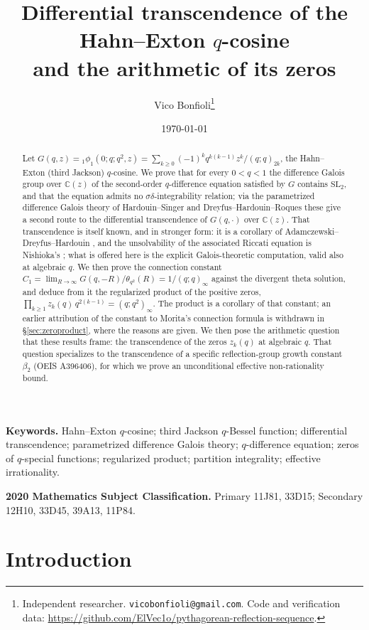 \documentclass[11pt]{article}
\title{Differential transcendence of the Hahn--Exton $q$-cosine\\ and the arithmetic of its zeros}
\author{Vico Bonfioli\thanks{Independent researcher. \texttt{vicobonfioli@gmail.com}. Code and
verification data: \url{https://github.com/ElVec1o/pythagorean-reflection-sequence}.}}
\date{\today}
\theoremstyle{plain}
\theoremstyle{definition}
\theoremstyle{remark}
\newcommand{\C}{\mathbb{C}}
\begin{document}
\maketitle

\begin{abstract}
Let $G(q,z)={}_1\phi_1(0;q;q^2,z)=\sum_{k\ge0}(-1)^kq^{k(k-1)}z^k/(q;q)_{2k}$, the Hahn--Exton (third
Jackson) $q$-cosine. We prove that for every $0<q<1$ the difference Galois group over $\C(z)$ of the
second-order $q$-difference equation satisfied by $G$ contains $\mathrm{SL}_2$, and that the equation
admits no $\sigma\delta$-integrability relation; via the parametrized difference Galois theory of
Hardouin--Singer \cite{HS} and Dreyfus--Hardouin--Roques \cite{DHR2018} these give a second route to the differential
transcendence of $G(q,\cdot)$ over $\C(z)$. That transcendence is itself known, and in stronger form:
it is a corollary of Adamczewski--Dreyfus--Hardouin \cite{ADH2021}, and the unsolvability of the
associated Riccati equation is Nishioka's \cite{Nishioka2016}; what is offered here is the explicit
Galois-theoretic computation, valid also at algebraic $q$. We then prove the connection constant
$C_1=\lim_{R\to\infty}G(q,-R)/\theta_{q^2}(R)=1/(q;q)_\infty$ against the divergent theta solution,
and deduce from it the regularized product of the positive zeros,
$\prod_{k\ge1}z_k(q)\,q^{2(k-1)}=(q;q^2)_\infty$. The product is a corollary of that constant;
an earlier attribution of the constant to Morita's connection formula \cite{Morita2011} is
withdrawn in \S\ref{sec:zeroproduct}, where the reasons are given. We then pose the arithmetic
question that these results frame: the transcendence of the zeros $z_k(q)$ at algebraic $q$. That
question specializes to the transcendence of a specific reflection-group growth constant $\beta_2$
(OEIS A396406), for which we prove an unconditional effective non-rationality bound.
\end{abstract}

\medskip
\noindent\textbf{Keywords.} Hahn--Exton $q$-cosine; third Jackson $q$-Bessel function; differential
transcendence; parametrized difference Galois theory; $q$-difference equation; zeros of
$q$-special functions; regularized product; partition integrality; effective irrationality.

\smallskip
\noindent\textbf{2020 Mathematics Subject Classification.} Primary 11J81, 33D15; Secondary 12H10,
33D45, 39A13, 11P84.

\section{Introduction}
\end{document}
